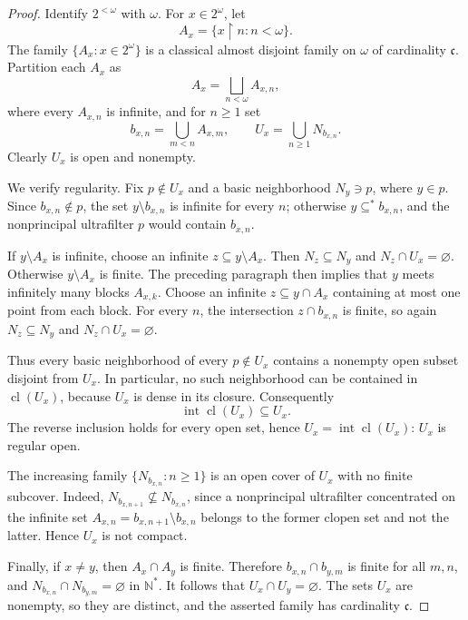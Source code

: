 \documentclass[11pt]{article}
\theoremstyle{definition}
\theoremstyle{remark}
\newcommand{\Int}{\operatorname{int}}
\newcommand{\cl}{\operatorname{cl}}
\newcommand{\restr}{\mathbin{\upharpoonright}}
\begin{document}
\begin{proof}
Identify \(2^{<\omega}\) with \(\omega\).  For \(x\in2^\omega\), let
\[
  A_x=\{x\restr n:n<\omega\}.
\]
The family \(\{A_x:x\in2^\omega\}\) is a classical almost disjoint family on
\(\omega\) of cardinality \(\mathfrak c\).  Partition each \(A_x\) as
\[
  A_x=\bigsqcup_{n<\omega} A_{x,n},
\]
where every \(A_{x,n}\) is infinite, and for \(n\geq1\) set
\[
  b_{x,n}=\bigcup_{m<n}A_{x,m},
  \qquad
  U_x=\bigcup_{n\geq1}N_{b_{x,n}}.
\]
Clearly \(U_x\) is open and nonempty.

We verify regularity.  Fix \(p\notin U_x\) and a basic neighborhood
\(N_y\ni p\), where \(y\in p\).  Since \(b_{x,n}\notin p\), the set
\(y\setminus b_{x,n}\) is infinite for every \(n\); otherwise
\(y\subseteq^*b_{x,n}\), and the nonprincipal ultrafilter \(p\) would contain
\(b_{x,n}\).

If \(y\setminus A_x\) is infinite, choose an infinite
\(z\subseteq y\setminus A_x\).  Then \(N_z\subseteq N_y\) and
\(N_z\cap U_x=\varnothing\).  Otherwise \(y\setminus A_x\) is finite.  The
preceding paragraph then implies that \(y\) meets infinitely many blocks
\(A_{x,k}\).  Choose an infinite \(z\subseteq y\cap A_x\) containing at most
one point from each block.  For every \(n\), the intersection
\(z\cap b_{x,n}\) is finite, so again
\(N_z\subseteq N_y\) and \(N_z\cap U_x=\varnothing\).

Thus every basic neighborhood of every \(p\notin U_x\) contains a nonempty
open subset disjoint from \(U_x\).  In particular, no such neighborhood can
be contained in \(\cl(U_x)\), because \(U_x\) is dense in its closure.
Consequently
\[
  \Int\cl(U_x)\subseteq U_x.
\]
The reverse inclusion holds for every open set, hence
\(U_x=\Int\cl(U_x)\): \(U_x\) is regular open.

The increasing family \(\{N_{b_{x,n}}:n\geq1\}\) is an open cover of
\(U_x\) with no finite subcover.  Indeed,
\(N_{b_{x,n+1}}\nsubseteq N_{b_{x,n}}\), since a nonprincipal ultrafilter
concentrated on the infinite set
\(A_{x,n}=b_{x,n+1}\setminus b_{x,n}\) belongs to the former clopen set and
not the latter.  Hence \(U_x\) is not compact.

Finally, if \(x\neq y\), then \(A_x\cap A_y\) is finite.  Therefore
\(b_{x,n}\cap b_{y,m}\) is finite for all \(m,n\), and
\(N_{b_{x,n}}\cap N_{b_{y,m}}=\varnothing\) in \(\mathbb N^*\).  It follows
that \(U_x\cap U_y=\varnothing\).  The sets \(U_x\) are nonempty, so they are
distinct, and the asserted family has cardinality \(\mathfrak c\).
\end{proof}
\end{document}
